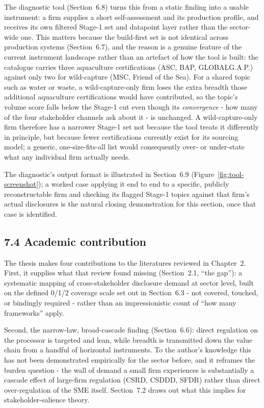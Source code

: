 \documentclass[
]{article}
\begin{document}
The diagnostic tool (Section~6.8) turns this from a static finding into a
usable instrument: a firm supplies a short self-assessment and its production
profile, and receives its own filtered Stage-1 set and datapoint layer rather
than the sector-wide one. This matters because the build-first set is not
identical across production systems (Section~6.7), and the reason is a
genuine feature of the current instrument landscape rather than an artefact
of how the tool is built: the catalogue carries three aquaculture
certifications (ASC, BAP, GLOBALG.A.P.) against only two for wild-capture
(MSC, Friend of the Sea). For a shared topic such as water or waste, a
wild-capture-only firm loses the extra breadth those additional aquaculture
certifications would have contributed, so the topic's volume score falls
below the Stage-1 cut even though its \emph{convergence} - how many of the
four stakeholder channels ask about it - is unchanged. A wild-capture-only
firm therefore has a narrower Stage-1 set not because the tool treats it
differently in principle, but because fewer certifications currently exist
for its sourcing model; a generic, one-size-fits-all list would consequently
over- or under-state what any individual firm actually needs.

The diagnostic's output format is illustrated in Section~6.9
(Figure~\ref{fig:tool-screenshot}); a worked case applying it end to end to a
specific, publicly reconstructable firm and checking its flagged Stage-1
topics against that firm's actual disclosures is the natural closing
demonstration for this section, once that case is identified.

\subsection{7.4 Academic contribution}\label{discussion-academic}

The thesis makes four contributions to the literatures reviewed in
Chapter~2. First, it supplies what that review found missing (Section~2.1,
``the gap''): a systematic mapping of cross-stakeholder disclosure demand at
sector level, built on the defined 0/1/2 coverage scale set out in
Section~6.3 - not covered, touched, or bindingly required - rather than
an impressionistic count of ``how many frameworks'' apply.

Second, the narrow-law, broad-cascade finding (Section~6.6): direct regulation on
the processor is targeted and lean, while breadth is transmitted down the value
chain from a handful of horizontal instruments. To the author's knowledge this has
not been demonstrated empirically for the sector before, and it reframes the
burden question - the wall of demand a small firm experiences is substantially a
cascade effect of large-firm regulation (CSRD, CSDDD, SFDR) rather than direct
over-regulation of the SME itself. Section~7.2 draws out what this implies for
stakeholder-salience theory.
\end{document}
